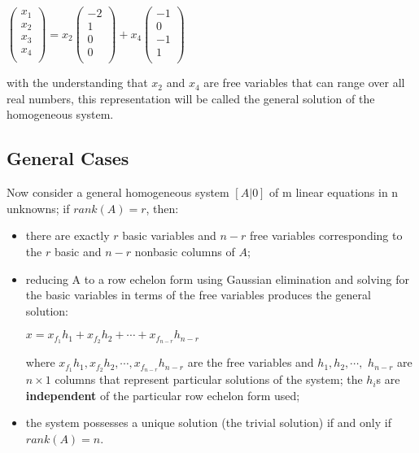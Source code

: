 \documentclass[UTF8,a4paper,11pt]{amsbook}
\begin{document}
\begin{center}
$\left(
\begin{array}{c}
x_{1} \\ 
x_{2} \\
x_{3} \\
x_{4} \\
\end{array}
\right)=x_{2}
\left(
\begin{array}{c}
-2 \\ 
1 \\
0 \\
0 \\
\end{array}
\right)+x_{4}
\left(
\begin{array}{c}
-1 \\ 
0 \\
-1 \\
1 \\
\end{array}
\right)$
\end{center}
with the understanding that $x_2$ and $x_4$ are free variables that can range over all real numbers, this representation will be called the general solution of the homogeneous system.
\subsection{General Cases}
Now consider a general homogeneous system $[A|0]$ of m linear equations in n unknowns; if $rank(A) = r$, then:
\begin{itemize}
\item there are exactly $r$ basic variables and $n - r$ free variables corresponding to the $r$ basic and $n - r$ nonbasic columns of $A$;
\item reducing A to a row echelon form using Gaussian elimination and
solving for the basic variables in terms of the free variables produces
the general solution:
\begin{center}
$x=x_{f_{1}}h_{1}+x_{f_{2}}h_{2}+\cdots +x_{f_{n-r}}h_{n-r}$
\end{center}
where $x_{f_{1}}h_{1}, x_{f_{2}}h_{2},\cdots , x_{f_{n-r}}h_{n-r}$ are the free variables and $h_{1}, h_{2},\cdots ,$ $h_{n-r}$ are $n\times 1$ columns that represent particular solutions of the system; the $h_i$s are \textbf{independent} of the particular row echelon form used;
\item the system possesses a unique solution (the trivial solution) if and
only if $rank(A) = n$.
\end{itemize}
\end{document}
